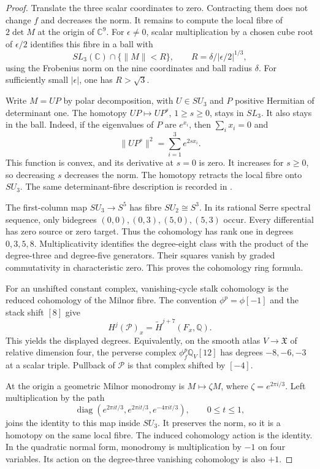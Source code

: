 \begin{proof}
Translate the three scalar coordinates to zero. Contracting them
does not change $f$ and decreases the norm. It remains to compute
the local fibre of $2\det M$ at the origin of $\mathbb C^9$.
For $\epsilon\ne0$, scalar multiplication by a chosen cube root
of $\epsilon/2$ identifies this fibre in a ball with
\[
 SL_3(\mathbb C)\cap\{\|M\|<R\},
 \qquad R=\delta/|\epsilon/2|^{1/3},
\]
using the Frobenius norm on the nine coordinates and ball radius
$\delta$. For sufficiently small $|\epsilon|$, one has $R>\sqrt3$.

Write $M=UP$ by polar decomposition, with $U\in SU_3$ and $P$
positive Hermitian of determinant one. The homotopy $UP\mapsto UP^s$,
$1\geq s\geq0$, stays in $SL_3$. It also stays in the ball.
Indeed, if the eigenvalues of $P$ are $e^{x_i}$, then
$\sum_i x_i=0$ and
\[
 \|UP^s\|^2=\sum_{i=1}^3 e^{2s x_i}.
\]
This function is convex, and its derivative at $s=0$ is zero.
It increases for $s\geq0$, so decreasing $s$ decreases the norm.
The homotopy retracts the local fibre onto $SU_3$.
The same determinant-fibre description is recorded in
\cite[\S1, pp.~4--5]{DamonDeterminantFibres}.

The first-column map $SU_3\to S^5$ has fibre $SU_2\cong S^3$.
In its rational Serre spectral sequence, only bidegrees
$(0,0),(0,3),(5,0),(5,3)$ occur. Every differential has zero source
or zero target. Thus the cohomology has rank one in degrees
$0,3,5,8$. Multiplicativity identifies the degree-eight class with
the product of the degree-three and degree-five generators.
Their squares vanish by graded commutativity in characteristic zero.
This proves the cohomology ring formula.

For an unshifted constant complex, vanishing-cycle stalk cohomology
is the reduced cohomology of the Milnor fibre.
The convention $\phi^p=\phi[-1]$ and the stack shift $[8]$ give
\[
 H^j(\mathcal P)_x=\widetilde H^{j+7}(F_x,\mathbb Q).
\]
This yields the displayed degrees. Equivalently, on the smooth
atlas $V\to\mathfrak X$ of relative dimension four,
the perverse complex $\phi_f^p\mathbb Q_V[12]$ has degrees
$-8,-6,-3$ at a scalar triple. Pullback of $\mathcal P$ is that
complex shifted by $[-4]$.

At the origin a geometric Milnor monodromy is $M\mapsto\zeta M$,
where $\zeta=e^{2\pi i/3}$. Left multiplication by the path
\[
 \operatorname{diag}(e^{2\pi it/3},e^{2\pi it/3},e^{-4\pi it/3}),
 \qquad 0\leq t\leq1,
\]
joins the identity to this map inside $SU_3$. It preserves the norm,
so it is a homotopy on the same local fibre. The induced cohomology
action is the identity. In the quadratic normal form, monodromy
is multiplication by $-1$ on four variables. Its action on the
degree-three vanishing cohomology is also $+1$.
\end{proof}

